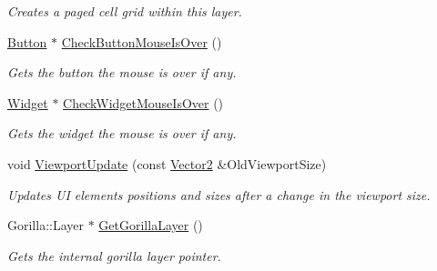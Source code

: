 \begin{DoxyCompactItemize}
\begin{DoxyCompactList}\small\item\em Creates a paged cell grid within this layer. \item\end{DoxyCompactList}\item 
\hyperlink{classphys_1_1UI_1_1Button}{Button} $\ast$ \hyperlink{classphys_1_1UI_1_1Layer_a3d401a77704cba509b418c53f92cc09d}{CheckButtonMouseIsOver} ()
\begin{DoxyCompactList}\small\item\em Gets the button the mouse is over if any. \item\end{DoxyCompactList}\item 
\hyperlink{classphys_1_1UI_1_1Widget}{Widget} $\ast$ \hyperlink{classphys_1_1UI_1_1Layer_ae80bef48442ac0737bfc1939fc2f9af1}{CheckWidgetMouseIsOver} ()
\begin{DoxyCompactList}\small\item\em Gets the widget the mouse is over if any. \item\end{DoxyCompactList}\item 
void \hyperlink{classphys_1_1UI_1_1Layer_a832101f21d8601f296782fc24ac02705}{ViewportUpdate} (const \hyperlink{classphys_1_1Vector2}{Vector2} \&OldViewportSize)
\begin{DoxyCompactList}\small\item\em Updates UI elements positions and sizes after a change in the viewport size. \item\end{DoxyCompactList}\item 
\hypertarget{classphys_1_1UI_1_1Layer_a6528081453b4f2be4d7a4ad8878edbf0}{
Gorilla::Layer $\ast$ \hyperlink{classphys_1_1UI_1_1Layer_a6528081453b4f2be4d7a4ad8878edbf0}{GetGorillaLayer} ()}
\label{classphys_1_1UI_1_1Layer_a6528081453b4f2be4d7a4ad8878edbf0}

\begin{DoxyCompactList}\small\item\em Gets the internal gorilla layer pointer. \item\end{DoxyCompactList}\end{DoxyCompactItemize}
